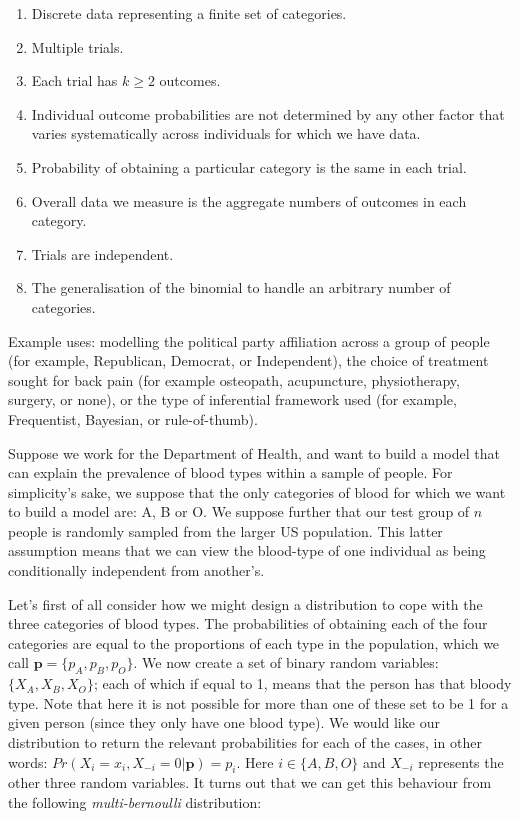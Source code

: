 \documentclass[11pt,fullpage]{book}
\begin{document}
\begin{enumerate} 
\item Discrete data representing a finite set of categories.
\item Multiple trials.
\item Each trial has $k\geq 2$ outcomes.
\item Individual outcome probabilities are not determined by any other factor that varies systematically across individuals for which we have data.
\item Probability of obtaining a particular category is the same in each trial.
\item Overall data we measure is the aggregate numbers of outcomes in each category.
\item Trials are independent.
\item The generalisation of the binomial to handle an arbitrary number of categories.
\end{enumerate}

Example uses: modelling the political party affiliation across a group of people (for example, Republican, Democrat, or Independent), the choice of treatment sought for back pain (for example osteopath, acupuncture, physiotherapy, surgery, or none), or the type of inferential framework used (for example, Frequentist, Bayesian, or rule-of-thumb).

Suppose we work for the Department of Health, and want to build a model that can explain the prevalence of blood types within a sample of people. For simplicity's sake, we suppose that the only categories of blood for which we want to build a model are: A, B or O. We suppose further that our test group of $n$ people is randomly sampled from the larger US population. This latter assumption means that we can view the blood-type of one individual as being conditionally independent from another's. 

Let's first of all consider how we might design a distribution to cope with the three categories of blood types. The probabilities of obtaining each of the four categories are equal to the proportions of each type in the population, which we call $\boldsymbol{p}=\{p_A,p_B,p_O\}$. We now create a set of binary random variables: $\{X_A,X_B,X_O\}$; each of which if equal to 1, means that the person has that bloody type. Note that here it is not possible for more than one of these set to be 1 for a given person (since they only have one blood type). We would like our distribution to return the relevant probabilities for each of the cases, in other words: $Pr(X_i=x_i,X_{-i}=0|\boldsymbol{p}) = p_i$. Here $i\in\{A,B,O\}$ and $X_{-i}$ represents the other three random variables. It turns out that we can get this behaviour from the following \textit{multi-bernoulli} distribution:
\end{document}
